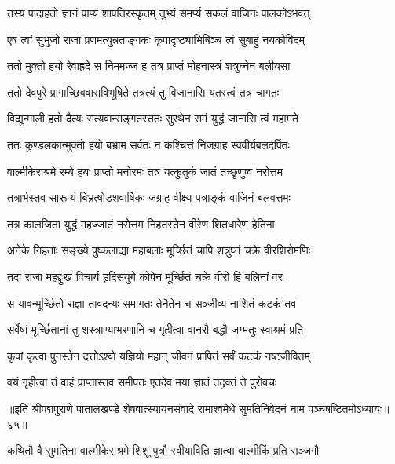\twolineshloka
{तस्य पादाहतो ज्ञानं प्राप्य शापतिरस्कृतम्}
{तुभ्यं समर्प्य सकलं वाजिनः पालकोऽभवत्}%

\twolineshloka
{एष त्वां सुभुजो राजा प्रणमत्युन्नताङ्गकः}
{कृपादृष्ट्याभिषिञ्च त्वं सुबाहुं नयकोविदम्}%

\twolineshloka
{ततो मुक्तो हयो रेवाह्रदे स निममज्ज ह}
{तत्र प्राप्तं मोहनास्त्रं शत्रुघ्नेन बलीयसा}%

\twolineshloka
{ततो देवपुरे प्रागाच्छिववासविभूषिते}
{तत्रत्यं तु विजानासि यतस्त्वं तत्र चागतः}%

\twolineshloka
{विद्युन्माली हतो दैत्यः सत्यवान्सङ्गतस्ततः}
{सुरथेन समं युद्धं जानासि त्वं महामते}%

\twolineshloka
{ततः कुण्डलकान्मुक्तो हयो बभ्राम सर्वतः}
{न कश्चित्तं निजग्राह स्ववीर्यबलदर्पितः}%

\twolineshloka
{वाल्मीकेराश्रमे रम्ये हयः प्राप्तो मनोरमः}
{तत्र यत्कुतुकं जातं तच्छृणुष्व नरोत्तम}%

\twolineshloka
{तत्रार्भस्तव सारूप्यं बिभ्रत्षोडशवार्षिकः}
{जग्राह वीक्ष्य पत्राङ्कं वाजिनं बलवत्तमः}%

\twolineshloka
{तत्र कालजिता युद्धं महज्जातं नरोत्तम}
{निहतस्तेन वीरेण शितधारेण हेतिना}%

\twolineshloka
{अनेके निहताः सङ्ख्ये पुष्कलाद्या महाबलाः}
{मूर्च्छितं चापि शत्रुघ्नं चक्रे वीरशिरोमणिः}%

\twolineshloka
{तदा राजा महद्दुःखं विचार्य हृदिसंयुगे}
{कोपेन मूर्च्छितं चक्रे वीरो हि बलिनां वरः}%

\twolineshloka
{स यावन्मूर्च्छितो राज्ञा तावदन्यः समागतः}
{तेनैतेन च सञ्जीव्य नाशितं कटकं तव}%

\twolineshloka
{सर्वेषां मूर्च्छितानां तु शस्त्राण्याभरणानि च}
{गृहीत्वा वानरौ बद्धौ जग्मतुः स्वाश्रमं प्रति}%

\twolineshloka
{कृपां कृत्वा पुनस्तेन दत्तोऽश्वो यज्ञियो महान्}
{जीवनं प्रापितं सर्वं कटकं नष्टजीवितम्}%

\twolineshloka
{वयं गृहीत्वा तं वाहं प्राप्तास्तव समीपतः}
{एतदेव मया ज्ञातं तदुक्तं ते पुरोवचः}%

॥इति श्रीपद्मपुराणे पातालखण्डे शेषवात्स्यायनसंवादे रामाश्वमेधे सुमतिनिवेदनं नाम पञ्चषष्टितमोऽध्यायः॥६५॥



\twolineshloka
{कथितौ वै सुमतिना वाल्मीकेराश्रमे शिशू}
{पुत्रौ स्वीयाविति ज्ञात्वा वाल्मीकिं प्रति सञ्जगौ}%


